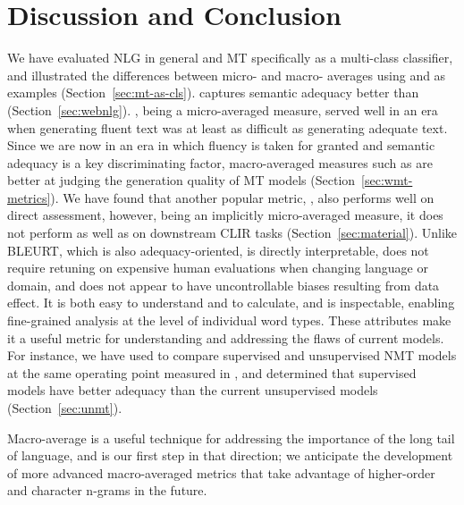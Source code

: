 \section{Discussion and Conclusion}
We have evaluated NLG in general and MT specifically as a multi-class classifier, and illustrated the differences between micro- and macro- averages using  and  as examples (Section~\ref{sec:mt-as-cls}).
 captures semantic adequacy better than  (Section~\ref{sec:webnlg}).
\bleu, being a micro-averaged measure, served well in an era when generating fluent text was at least as difficult as generating adequate text. Since we are now in an era in which fluency is taken for granted and semantic adequacy is a key discriminating factor, macro-averaged measures such as  are better at judging the generation quality of MT models (Section~\ref{sec:wmt-metrics}).
We have found that another popular metric, , also performs well on direct assessment,
however, being an implicitly micro-averaged measure, it does not perform as well as  on downstream CLIR tasks (Section~\ref{sec:material}).
Unlike BLEURT, which is also adequacy-oriented,  is directly interpretable, does not require retuning on expensive human evaluations when changing language or domain, and does not appear to have uncontrollable biases resulting from data effect.
It is both easy to understand and to calculate, and is  
inspectable, enabling fine-grained analysis at the level of individual word types. These attributes make it a useful metric for understanding and addressing the flaws of current models. For instance, we have used  to compare supervised and unsupervised NMT models at the same operating point measured in \bleu, and determined that supervised models have better adequacy than the current unsupervised models (Section~\ref{sec:unmt}).

Macro-average is a useful technique for addressing the importance of the long tail of language, and  is our first step in that direction; we anticipate the development of more advanced macro-averaged metrics that take advantage of higher-order and character n-grams in the future. 